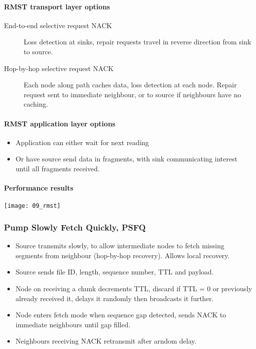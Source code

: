 \paragraph{RMST transport layer options}

\begin{description}
		\item[End-to-end selective request NACK] Loss detection at sinks,
				repair requests travel in reverse direction from sink to
				source.
		\item[Hop-by-hop selective request NACK] Each node along path caches
				data, loss detection at each node. Repair request sent to
				immediate neighbour, or to source if neighbours have no
				caching.
\end{description}

\paragraph{RMST application layer options}

\begin{itemize}
		\item Application can either wait for next reading
		\item Or have source send data in fragments, with sink communicating
				interest until all fragments received.
\end{itemize}

\paragraph{Performance results}

\texttt{[image: 09\_rmst]}

\subsubsection{Pump Slowly Fetch Quickly, PSFQ}

\begin{itemize}
		\item Source transmits slowly, to allow intermediate nodes to fetch
				missing segments from neighbour (hop-by-hop recovery). Allows
				local recovery.
		\item Source sends file ID, length, sequence number, TTL and payload.
		\item Node on receiving a chunk decrements TTL, discard if TTL = 0 or
				previously already received it, delays it randomly then
				broadcasts it further.
		\item Node enters fetch mode when sequence gap detected, sends NACK to
				immediate neighbours until gap filled.
		\item Neighbours receiving NACK retransmit after arndom delay.
\end{itemize}

